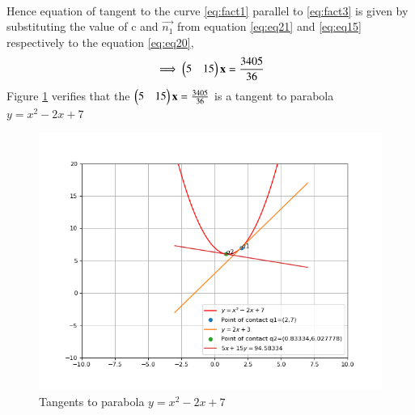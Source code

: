 \documentclass[journal,12pt,twocolumn]{IEEEtran}
\begin{document}
\begin{enumerate}
\begin{align}
		\label{eq:eq21}
	\end{align}
	Hence equation of tangent to the curve \eqref{eq:fact1} parallel to \eqref{eq:fact3} is given by substituting the value of c and $\vec{n_1}$ from equation \eqref{eq:eq21} and \eqref{eq:eq15} respectively to the equation \eqref{eq:eq20},
	\begin{align}
		\implies\begin{pmatrix}5&15\end{pmatrix}\mathbf{x} = \frac{3405}{36} 
	\end{align}
	Figure \ref{eq:fig1} verifies that the $\begin{pmatrix}5&15\end{pmatrix}\mathbf{x} = \frac{3405}{36}$ is a tangent to parabola  $y = x^2-2x+7$
	\begin{figure}
		\centering
		\includegraphics[width=\columnwidth]{./codes/parallelPerpendicularLineTangent.png}
		\caption{Tangents to parabola $y = x^2-2x+7$}
		\label{eq:fig1}
	\end{figure}

	\end{enumerate}
		
	
\end{document}
